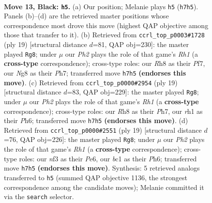 \documentclass[11pt]{article}
\begin{document}
\clearpage

\begin{figure}[p]\centering
\begin{subfigure}{0.46\textwidth}\centering
\resizebox{\linewidth}{!}{%
\newchessgame
\chessboard[
  setfen={2kr1bnr/pp1b3p/1qn1p1p1/3pP1P1/1P1P4/P4N2/5P2/RNBQKB1R b KQ - 0 13},
  showmover=false,
  pgfstyle=straightmove, color=movearrow, markmove={h7-h5}
]}
\caption{}
\end{subfigure}\hfill
\begin{subfigure}{0.46\textwidth}\centering
\resizebox{\linewidth}{!}{%
\newchessgame
\chessboard[
  setfen={r3kb1r/pp1b1p1p/1qn1p2p/3pP3/1P1P4/P4N1P/5PP1/RN1QKB1R b KQkq - 0 10},
  showmover=false,
  pgfstyle=straightmove, color=movearrow, markmove={h8-g8}
]}
\caption{}
\end{subfigure}
\\[4pt]
\begin{subfigure}{0.46\textwidth}\centering
\resizebox{\linewidth}{!}{%
\newchessgame
\chessboard[
  setfen={r3kb1r/pp1b1p1p/1qn1p2p/3pP3/1P1P4/P4N2/4BPPP/RN1QK2R b KQkq - 2 10},
  showmover=false,
  pgfstyle=straightmove, color=movearrow, markmove={h8-g8}
]}
\caption{}
\end{subfigure}\hfill
\begin{subfigure}{0.46\textwidth}\centering
\resizebox{\linewidth}{!}{%
\newchessgame
\chessboard[
  setfen={r3kb1r/pp1b1p1p/1qn1p2p/3pP3/1P1P4/P4N2/R4PPP/1N1QKB1R b Kkq - 2 10},
  showmover=false,
  pgfstyle=straightmove, color=movearrow, markmove={h8-g8}
]}
\caption{}
\end{subfigure}
\caption{\textbf{Move 13, Black: \texttt{h5}.} (a) Our position; Melanie plays \texttt{h5} (\texttt{h7h5}). Panels (b)--(d) are the retrieved master positions whose correspondence most drove this move (highest QAP objective among those that transfer to it). (b) Retrieved from \texttt{ccrl\_top\_p0003\#1728} (ply 19) [structural distance $d$=81, QAP obj=230]: the master played \texttt{Rg8}; under $\mu$ our \emph{Ph2} plays the role of that game's \emph{Rh1} (a \textbf{cross-type} correspondence); cross-type roles: our \emph{R}h8 as their \emph{P}f7, our \emph{N}g8 as their \emph{P}h7; transferred move \texttt{h7h5} \textbf{(endorses this move)}. (c) Retrieved from \texttt{ccrl\_top\_p0000\#2954} (ply 19) [structural distance $d$=83, QAP obj=229]: the master played \texttt{Rg8}; under $\mu$ our \emph{Ph2} plays the role of that game's \emph{Rh1} (a \textbf{cross-type} correspondence); cross-type roles: our \emph{R}h8 as their \emph{P}h7, our \emph{r}h1 as their \emph{P}h6; transferred move \texttt{h7h5} \textbf{(endorses this move)}. (d) Retrieved from \texttt{ccrl\_top\_p0000\#2551} (ply 19) [structural distance $d$=76, QAP obj=226]: the master played \texttt{Rg8}; under $\mu$ our \emph{Ph2} plays the role of that game's \emph{Rh1} (a \textbf{cross-type} correspondence); cross-type roles: our \emph{n}f3 as their \emph{P}e6, our \emph{b}c1 as their \emph{P}h6; transferred move \texttt{h7h5} \textbf{(endorses this move)}. Synthesis: 5 retrieved analogs transferred to \texttt{h5} (summed QAP objective 1136, the strongest correspondence among the candidate moves); Melanie committed it via the \texttt{search} selector.}

\end{figure}
\end{document}
